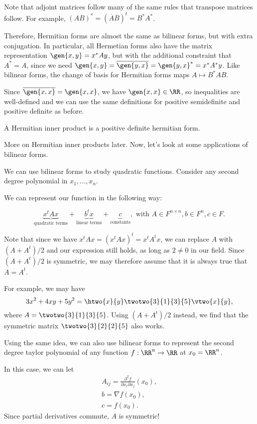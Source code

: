 Note that adjoint matrices follow many of the same rules that transpose matrices follow. For example, $(AB)^{*} = (\overline{A}\overline{B})^t = B^*A^*$. 

Therefore, Hermitian forms are almost the same as bilinear forms, but with extra conjugation. In particular, all Hermetian forms also have the matrix representation $\gen{x,y} = x^*Ay$, but with the additional constraint that $A^* = A$, since we need $\gen{x,y} = \overline{\gen{y,x}} = \gen{y,x}^* = x^*A^*{y}$. Like bilinear forms, the change of basis for Hermitian forms maps $A\mapsto B^*AB$. 

Since $\overline{\gen{x,x}} = \gen{x,x}$, we have $\gen{x,x}\in \RR$, so inequalities are well-defined and we can use the same definitions for \ac{positive semidefinite} and \ac{positive definite} as before.

\begin{definition}

A \ac{Hermitian inner product} is a positive definite hermitian form. 
\end{definition}

More on Hermitian inner products later. Now, let's look at some applications of bilinear forms. 

\begin{example}
\exlabel

We can use bilinear forms to study quadratic functions. Consider any second degree polynomial in $x_1, \hdots, x_n$. 
\end{example}

We can represent our function in the following way:

\[\underbrace{x^tAx}_{\text{quadratic terms}} + \underbrace{b^tx}_{\text{linear terms}} + \underbrace{c}_{\text{constants}}, \text{ with }A\in F^{n\times n}, b\in F^n, c\in F.\]

Note that since we have $x^tAx = (x^tAx)^t = x^tA^tx$, we can replace $A$ with $(A+A^t)/2$ and our expression still holds, as long as $2\neq 0$ in our field. Since $(A+A^t)/2$ is symmetric, we may therefore assume that it is always true that $A = A^t$.

For example, we may have
\[3x^2 + 4xy + 5y^2 = \htwo{x}{y}\twotwo{3}{1}{3}{5}\vtwo{x}{y},\]
where $A = \twotwo{3}{1}{3}{5}$. Using $(A+A^t)/2$ instead, we find that the symmetric matrix $\twotwo{3}{2}{2}{5}$ also works. \V

\begin{example}
\exlabel 

Using the same idea, we can also use bilinear forms to represent the second degree taylor polynomial of any function $f: \RR^n\rightarrow \RR$ at $x_0 = \RR^n$. 
\end{example}

In this case, we can let 
\begin{align*}
    A_{ij} = \frac{\partial^2 f}{\partial x_i\partial x_j}(x_0), \\
    b = \nabla f(x_0), \\
    c = f(x_0).
\end{align*}
Since partial derivatives commute, $A$ is symmetric!



